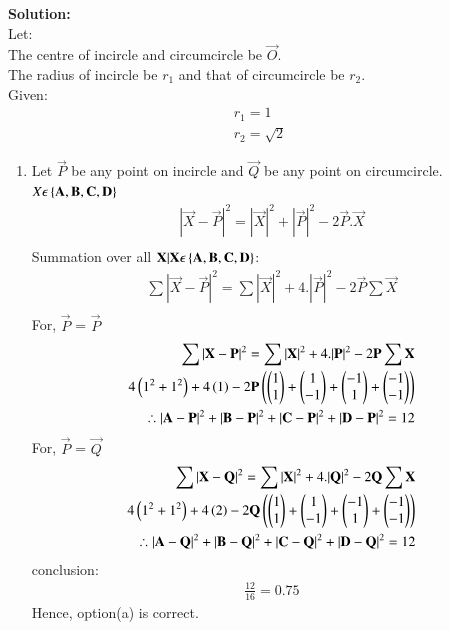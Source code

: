 \documentclass[journal]{IEEEtran}
\begin{document}
\textbf{Solution: }\\
Let:\\
The centre of incircle and circumcircle be $\vec{O}$.\\
The radius of incircle be $r_1$ and that of circumcircle be $r_2$.\\
Given:
\begin{align}
    r_1 = 1\\
    r_2 = \sqrt{2}
\end{align}
\begin{enumerate}
\item Let $\vec{P}$ be any point on incircle and $\vec{Q}$ be any point on circumcircle.\\
$X\epsilon \left\{\mathbf{A,B,C,D}\right\}$
\begin{align}
    |\vec{X}-\vec{P}|^2 = |\vec{X}|^2 + |\vec{P}|^2 - 2\vec{P}.\vec{X}\\
\end{align}
Summation over all $\mathbf{X}|\mathbf{X}\epsilon \left\{\mathbf{A,B,C,D}\right\}$:
\begin{align}
    \sum |\vec{X}-\vec{P}|^2 = \sum |\vec{X}|^2 + 4.|\vec{P}|^2 -2\vec{P}\sum \vec{X}\\
\end{align}
For, $\vec{P}$ = $\vec{P}$
\begin{align}
    \sum |\mathbf{X}-\mathbf{P}|^2 = \sum |\mathbf{X}|^2 + 4.|\mathbf{P}|^2 -2\mathbf{P}\sum \mathbf{X}\\
    4\left(1^2+1^2\right) + 4\left(1\right)-2\mathbf{P}\left(\begin{pmatrix}1\\1\end{pmatrix}+\begin{pmatrix}1\\-1\end{pmatrix}+\begin{pmatrix}-1\\1\end{pmatrix}+\begin{pmatrix}-1\\-1\end{pmatrix}\right)\\
    \therefore |\mathbf{A}-\mathbf{P}|^2+|\mathbf{B}-\mathbf{P}|^2+|\mathbf{C}-\mathbf{P}|^2+|\mathbf{D}-\mathbf{P}|^2 = 12
\end{align}
For, $\vec{P}$ = $\vec{Q}$
\begin{align}
    \sum |\mathbf{X}-\mathbf{Q}|^2 = \sum |\mathbf{X}|^2 + 4.|\mathbf{Q}|^2 -2\mathbf{Q}\sum \mathbf{X}\\
    4\left(1^2+1^2\right) + 4\left(2\right)-2\mathbf{Q}\left(\begin{pmatrix}1\\1\end{pmatrix}+\begin{pmatrix}1\\-1\end{pmatrix}+\begin{pmatrix}-1\\1\end{pmatrix}+\begin{pmatrix}-1\\-1\end{pmatrix}\right)\\
    \therefore |\mathbf{A}-\mathbf{Q}|^2+|\mathbf{B}-\mathbf{Q}|^2+|\mathbf{C}-\mathbf{Q}|^2+|\mathbf{D}-\mathbf{Q}|^2 = 12
\end{align}
conclusion:
\begin{align}
    \frac{12}{16}=0.75
\end{align}
Hence, option(a) is correct.


\end{enumerate}
\end{document}
